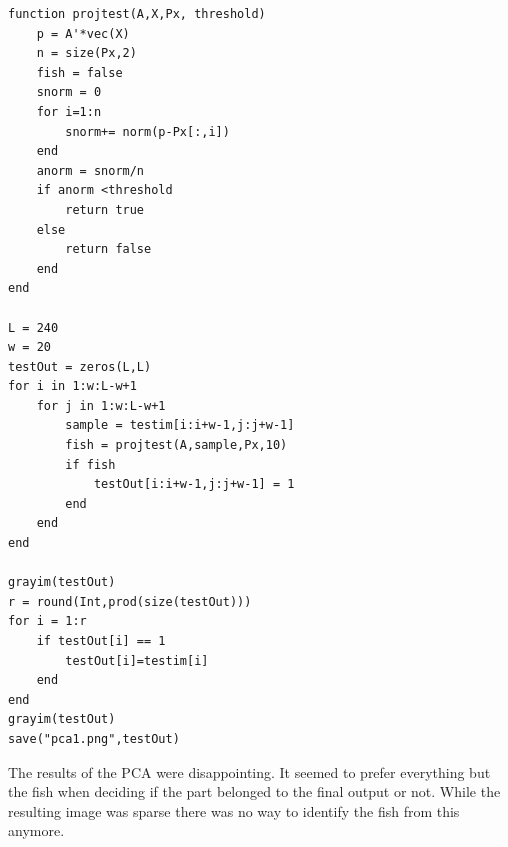 \documentclass[11pt]{article} %
\begin{document}
\begin{lstlisting}
function projtest(A,X,Px, threshold)
    p = A'*vec(X)
    n = size(Px,2)
    fish = false
    snorm = 0
    for i=1:n
        snorm+= norm(p-Px[:,i])
    end
    anorm = snorm/n
    if anorm <threshold
        return true
    else
        return false
    end
end

L = 240
w = 20
testOut = zeros(L,L)
for i in 1:w:L-w+1
    for j in 1:w:L-w+1
        sample = testim[i:i+w-1,j:j+w-1]
        fish = projtest(A,sample,Px,10)
        if fish
            testOut[i:i+w-1,j:j+w-1] = 1
        end
    end
end

grayim(testOut)
r = round(Int,prod(size(testOut)))
for i = 1:r
    if testOut[i] == 1
        testOut[i]=testim[i]
    end
end
grayim(testOut)
save("pca1.png",testOut)
\end{lstlisting}



The results of the PCA were disappointing. It seemed to prefer everything but the fish when
deciding if the part belonged to the final output or not. While the resulting image was sparse
there was no way to identify the fish from this anymore.
\end{document}
